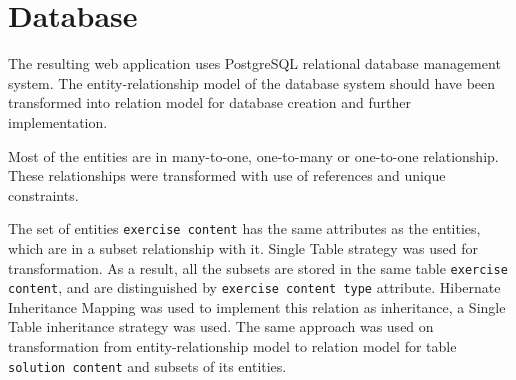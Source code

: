     
    \section{Database}
    The resulting web application uses PostgreSQL relational database management system. The entity-relationship model of the database system should have been transformed into relation model for database creation and further implementation.
    
    Most of the entities are in many-to-one, one-to-many or one-to-one relationship. These relationships were transformed with use of references and unique constraints.
    
    The set of entities \texttt{exercise content} has the same attributes as the entities, which are in a subset relationship with it. Single Table strategy was used for transformation. As a result, all the subsets are stored in the same table \texttt{exercise content}, and are distinguished by \texttt{exercise content type} attribute. Hibernate Inheritance Mapping was used to implement this relation as inheritance, a Single Table inheritance strategy was used. The same approach was used on transformation from entity-relationship model to relation model for table \texttt{solution content} and subsets of its entities.
    
    
    
    
    

